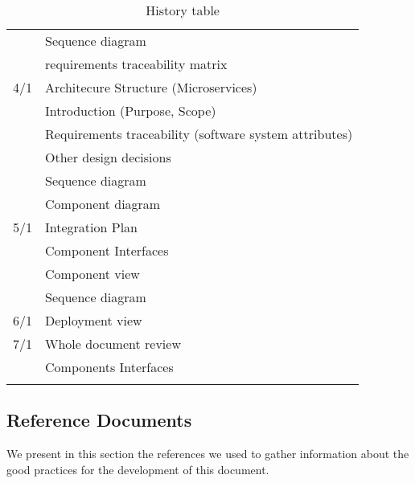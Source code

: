 \begin{center}
\begin{longtable}{ll}
         & Sequence diagram \\
         & requirements traceability matrix \\
        \hline
        4/1 & Architecure Structure (Microservices) \\
         & Introduction (Purpose, Scope) \\
         & Requirements traceability (software system attributes) \\
         & Other design decisions \\
         & Sequence diagram \\
         & Component diagram \\
        \hline
        5/1 & Integration Plan \\
         & Component Interfaces \\
         & Component view \\
         & Sequence diagram \\
        \hline
        6/1 & Deployment view \\
        \hline
        7/1 & Whole document review \\
         & Components Interfaces \\
        \hline
        
        \rowcolor{white}\caption{\label{tab:history}History table}
        
    \end{longtable}
\end{center}

\subsection{Reference Documents}
\label{sec:ref_docs}
We present in this section the references we used to gather information about the good practices for the development of this document.
\begingroup
\renewcommand{\section}[2]{}%
\nocite{*}


\endgroup



